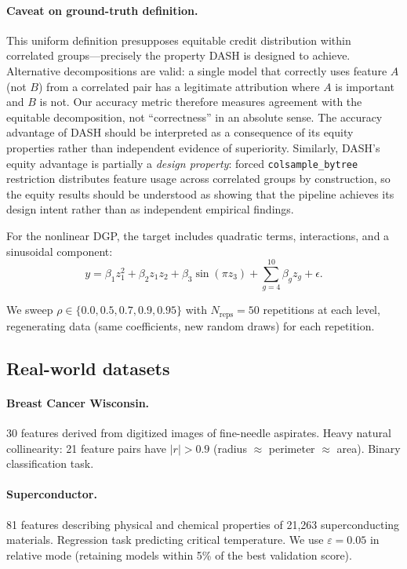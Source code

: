 \documentclass[10pt]{article}
\newcommand{\dash}{\textsc{DASH}}
\newcommand{\rhovar}{\rho}
\begin{document}
\paragraph{Caveat on ground-truth definition.}
This uniform definition presupposes equitable credit distribution
within correlated groups---precisely the property \dash{} is designed
to achieve. Alternative decompositions are valid: a single model that
correctly uses feature $A$ (not $B$) from a correlated pair has a
legitimate attribution where $A$ is important and $B$ is not. Our
accuracy metric therefore measures agreement with the equitable
decomposition, not ``correctness'' in an absolute sense. The accuracy
advantage of \dash{} should be interpreted as a consequence of its
equity properties rather than independent evidence of superiority.
Similarly, \dash{}'s equity advantage is partially a \emph{design
property}: forced \texttt{colsample\_bytree} restriction distributes
feature usage across correlated groups by construction, so the equity
results should be understood as showing that the pipeline achieves
its design intent rather than as independent empirical findings.

For the nonlinear DGP, the target includes quadratic terms, interactions,
and a sinusoidal component:
\begin{equation}
  y = \beta_1 z_1^2 + \beta_2 z_1 z_2 + \beta_3 \sin(\pi z_3) +
  \sum_{g=4}^{10} \beta_g z_g + \epsilon.
\end{equation}

We sweep $\rhovar \in \{0.0, 0.5, 0.7, 0.9, 0.95\}$ with $N_{\text{reps}}
= 50$ repetitions at each level, regenerating data (same coefficients, new
random draws) for each repetition.

\subsection{Real-world datasets}

\paragraph{Breast Cancer Wisconsin.}
30 features derived from digitized images of fine-needle aspirates. Heavy
natural collinearity: 21 feature pairs have $|r| > 0.9$ (radius $\approx$
perimeter $\approx$ area). Binary classification task.

\paragraph{Superconductor.}
81 features describing physical and chemical properties of 21,263
superconducting materials. Regression task predicting critical temperature.
We use $\varepsilon = 0.05$ in relative mode (retaining models within
5\% of the best validation score).
\end{document}

